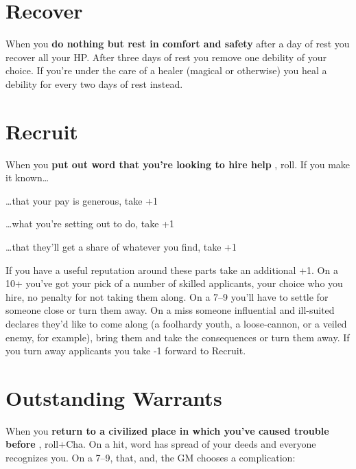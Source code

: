        
\section{Recover}   
       

When you {\bf do nothing but rest in comfort and safety}  after a day of rest you recover all your HP. After three days of rest you remove one debility of your choice. If you're under the care of a healer (magical or otherwise) you heal a debility for every two days of rest instead.

       
\section{Recruit}   
       

When you {\bf put out word that you're looking to hire help} , roll. If you make it known…

       
\startitemize[1,packed]
         
\item …that your pay is generous, take +1

         
\item …what you're setting out to do, take +1

         
\item …that they'll get a share of whatever you find, take +1

       
\stopitemize
       

If you have a useful reputation around these parts take an additional +1. On a 10+ you've got your pick of a number of skilled applicants, your choice who you hire, no penalty for not taking them along. On a 7–9 you'll have to settle for someone close or turn them away. On a miss someone influential and ill-suited declares they'd like to come along (a foolhardy youth, a loose-cannon, or a veiled enemy, for example), bring them and take the consequences or turn them away. If you turn away applicants you take -1 forward to Recruit.

       
\section{Outstanding Warrants}   
       

When you {\bf return to a civilized place in which you've caused trouble before} , roll+Cha. On a hit, word has spread of your deeds and everyone recognizes you. On a 7–9, that, and, the GM chooses a complication:

